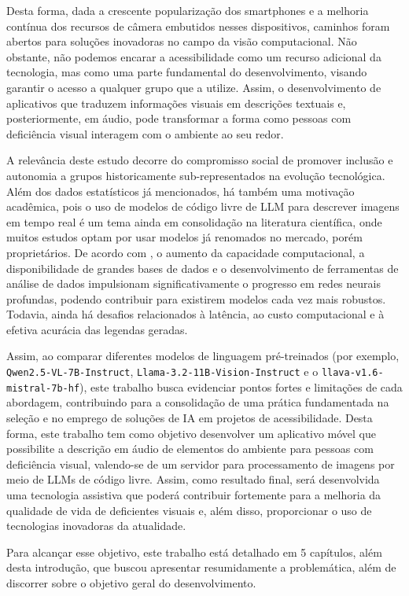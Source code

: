 Desta forma, dada a crescente popularização dos smartphones e a melhoria contínua dos recursos de câmera embutidos nesses dispositivos, caminhos foram abertos para soluções inovadoras no campo da visão computacional. Não obstante, não podemos encarar a acessibilidade como um recurso adicional da tecnologia, mas como uma parte fundamental do desenvolvimento, visando garantir o acesso a qualquer grupo que a utilize. Assim, o desenvolvimento de aplicativos que traduzem informações visuais em descrições textuais e, posteriormente, em áudio, pode transformar a forma como pessoas com deficiência visual interagem com o ambiente ao seu redor.

A relevância deste estudo decorre do compromisso social de promover inclusão e autonomia a grupos historicamente sub-representados na evolução tecnológica. Além dos dados estatísticos já mencionados, há também uma motivação acadêmica, pois o uso de modelos de código livre de LLM para descrever imagens em tempo real é um tema ainda em consolidação na literatura científica, onde muitos estudos optam por usar modelos já renomados no mercado, porém proprietários. De acordo com , o aumento da capacidade computacional, a disponibilidade de grandes bases de dados e o desenvolvimento de ferramentas de análise de dados impulsionam significativamente o progresso em redes neurais profundas, podendo contribuir para existirem modelos cada vez mais robustos. Todavia, ainda há desafios relacionados à latência, ao custo computacional e à efetiva acurácia das legendas geradas.

Assim, ao comparar diferentes modelos de linguagem pré-treinados (por exemplo, \texttt{Qwen2.5-VL-7B-Instruct}, \texttt{Llama-3.2-11B-Vision-Instruct} e o \texttt{llava-v1.6-mistral-7b-hf}), este trabalho busca evidenciar pontos fortes e limitações de cada abordagem, contribuindo para a consolidação de uma prática fundamentada na seleção e no emprego de soluções de IA em projetos de acessibilidade. Desta forma, este trabalho tem como objetivo desenvolver um aplicativo móvel que possibilite a descrição em áudio de elementos do ambiente para pessoas com deficiência visual, valendo-se de um servidor para processamento de imagens por meio de LLMs de código livre. Assim, como resultado final, será desenvolvida uma tecnologia assistiva que poderá contribuir fortemente para a melhoria da qualidade de vida de deficientes visuais e, além disso, proporcionar o uso de tecnologias inovadoras da atualidade.

Para alcançar esse objetivo, este trabalho está detalhado em 5 capítulos, além desta introdução, que buscou apresentar resumidamente a problemática, além de discorrer sobre o objetivo geral do desenvolvimento.

